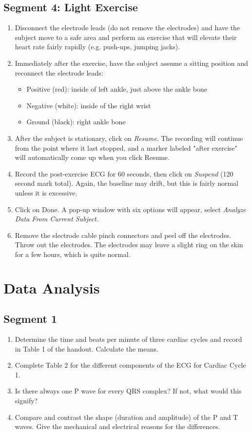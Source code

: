 \documentclass{article}
\begin{document}
\subsection*{Segment 4: Light Exercise}
\begin{enumerate}
	\item Disconnect the electrode leads (do not remove the electrodes) and have the subject move to a safe area and perform an exercise that will elevate their heart rate fairly rapidly (e.g. push-ups, jumping jacks).
	\item Immediately after the exercise, have the subject assume a sitting position and reconnect the electrode leads: \begin{itemize}
		\item Positive (red): inside of left ankle, just above the ankle bone
		\item Negative (white): inside of the right wrist
		\item Ground (black): right ankle bone
	\end{itemize}
	
	\item After the subject is stationary, click on \textit{Resume}. The recording will continue from the point where it last stopped, and a marker labeled "after exercise" will automatically come up when you click Resume.
	\item Record the post-exercise ECG for 60 seconds, then click on \textit{Suspend} (120 second mark total). Again, the baseline may drift, but this is fairly normal unless it is excessive.
	\item Click on Done. A pop-up window with six options will appear, select \textit{Analyze Data From Current Subject.}
	\item Remove the electrode cable pinch connectors and peel off the electrodes. Throw out the electrodes. The electrodes may leave a slight ring on the skin for a few hours, which is quite normal.
\end{enumerate}

\section*{Data Analysis}
\subsection*{Segment 1}
\begin{enumerate}
	\item Determine the time and beats per minute of three cardiac cycles and record in Table 1 of the handout. Calculate the means.
	\item Complete Table 2 for the different components of the ECG for Cardiac Cycle 1.
	\item Is there always one P wave for every QRS complex? If not, what would this signify?
	\item Compare and contrast the shape (duration and amplitude) of the P and T waves. Give the mechanical and electrical reasons for the differences.
\end{enumerate}
\end{document}
